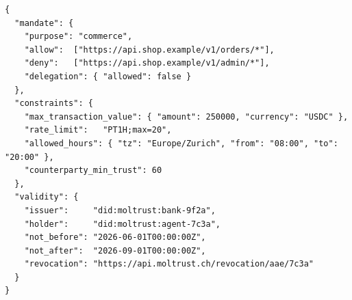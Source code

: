 \begin{lstlisting}[basicstyle=\ttfamily\footnotesize,breaklines=true,frame=single,
                   framesep=4pt,xleftmargin=2pt,showstringspaces=false]
{
  "mandate": {
    "purpose": "commerce",
    "allow":  ["https://api.shop.example/v1/orders/*"],
    "deny":   ["https://api.shop.example/v1/admin/*"],
    "delegation": { "allowed": false }
  },
  "constraints": {
    "max_transaction_value": { "amount": 250000, "currency": "USDC" },
    "rate_limit":   "PT1H;max=20",
    "allowed_hours": { "tz": "Europe/Zurich", "from": "08:00", "to": "20:00" },
    "counterparty_min_trust": 60
  },
  "validity": {
    "issuer":     "did:moltrust:bank-9f2a",
    "holder":     "did:moltrust:agent-7c3a",
    "not_before": "2026-06-01T00:00:00Z",
    "not_after":  "2026-09-01T00:00:00Z",
    "revocation": "https://api.moltrust.ch/revocation/aae/7c3a"
  }
}
\end{lstlisting}
